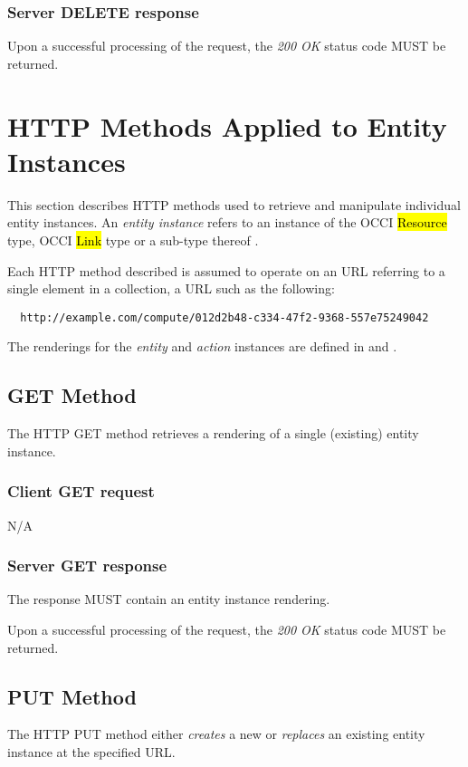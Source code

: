 \documentclass[10pt,a4paper]{article}
\begin{document}
\subsubsection*{Server DELETE response}
Upon a successful processing of the request, the \emph{200 OK} status code MUST be returned.

\section{HTTP Methods Applied to Entity Instances}
\label{sec:http_methods_ei}

This section describes HTTP methods used to retrieve and manipulate
individual entity instances. An {\em entity instance} refers to an instance
of the OCCI \hl{Resource} type, OCCI \hl{Link} type or a sub-type thereof
\cite{occi:core}.

Each HTTP method described is assumed to operate on an URL referring to
a single element in a collection, a URL such as the following:
\begin{verbatim}
  http://example.com/compute/012d2b48-c334-47f2-9368-557e75249042
\end{verbatim}

The renderings for the {\em entity} and {\em action} instances are defined in \cite{occi:text} and \cite{occi:json}.

\subsection{GET Method}
The HTTP GET method retrieves a rendering of a single (existing) entity instance.

\subsubsection*{Client GET request}
N/A

\subsubsection*{Server GET response}
The response MUST contain an entity instance rendering.

Upon a successful processing of the request, the \emph{200 OK} status code MUST be returned.

\subsection{PUT Method}
The HTTP PUT method either {\em creates} a new or {\em replaces} an existing
entity instance at the specified URL.
\end{document}
